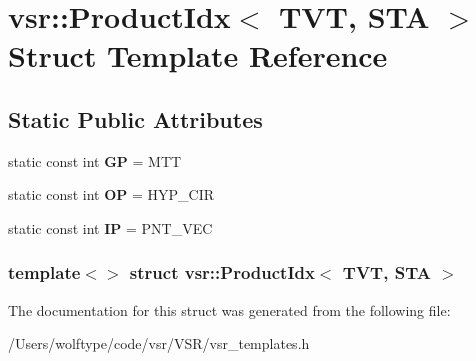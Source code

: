 \hypertarget{structvsr_1_1_product_idx_3_01_t_v_t_00_01_s_t_a_01_4}{\section{vsr\-:\-:Product\-Idx$<$ T\-V\-T, S\-T\-A $>$ Struct Template Reference}
\label{structvsr_1_1_product_idx_3_01_t_v_t_00_01_s_t_a_01_4}
}
\subsection*{Static Public Attributes}
\begin{DoxyCompactItemize}
\item 
\hypertarget{structvsr_1_1_product_idx_3_01_t_v_t_00_01_s_t_a_01_4_ab71b72dd1705828ffc8f463bb4b7b821}{static const int {\bfseries G\-P} = M\-T\-T}\label{structvsr_1_1_product_idx_3_01_t_v_t_00_01_s_t_a_01_4_ab71b72dd1705828ffc8f463bb4b7b821}

\item 
\hypertarget{structvsr_1_1_product_idx_3_01_t_v_t_00_01_s_t_a_01_4_ac5109750dc857682a1b6b6ac1658d0af}{static const int {\bfseries O\-P} = H\-Y\-P\-\_\-\-C\-I\-R}\label{structvsr_1_1_product_idx_3_01_t_v_t_00_01_s_t_a_01_4_ac5109750dc857682a1b6b6ac1658d0af}

\item 
\hypertarget{structvsr_1_1_product_idx_3_01_t_v_t_00_01_s_t_a_01_4_a0969a4dc64484a6541abc1555ba1c2ee}{static const int {\bfseries I\-P} = P\-N\-T\-\_\-\-V\-E\-C}\label{structvsr_1_1_product_idx_3_01_t_v_t_00_01_s_t_a_01_4_a0969a4dc64484a6541abc1555ba1c2ee}

\end{DoxyCompactItemize}
\subsubsection*{template$<$$>$ struct vsr\-::\-Product\-Idx$<$ T\-V\-T, S\-T\-A $>$}



The documentation for this struct was generated from the following file\-:\begin{DoxyCompactItemize}
\item 
/\-Users/wolftype/code/vsr/\-V\-S\-R/vsr\-\_\-templates.\-h\end{DoxyCompactItemize}
